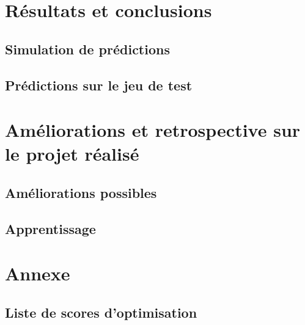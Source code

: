 \documentclass{article}
\numberwithin{equation}{section}
\begin{document}

\section{Résultats et conclusions} \label{sec:resultats}
\subsection{Simulation de prédictions} \label{subsec:simulation}


\subsection{Prédictions sur le jeu de test} \label{subsec:predictions}



\section{Améliorations et retrospective sur le projet réalisé} \label{sec:ameliorations}
\subsection{Améliorations possibles} \label{subsec:ameliorations}


\subsection{Apprentissage} \label{subsec:apprentissage}



\section{Annexe} \label{sec:annexe}
\subsection{Liste de scores d'optimisation} \label{subsec:scores}

\end{document}
